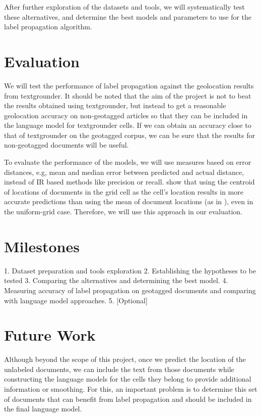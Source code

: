 \documentclass[11pt]{article}
\begin{document}
After further exploration of the datasets and tools, we will systematically test these alternatives, and determine the best models and parameters to use 
for the label propagation algorithm.


\section{Evaluation}
We will test the performance of label propagation against the geolocation results from textgrounder. 
It should be noted that the aim of the project is not to beat the results obtained using textgrounder,
but instead to get a reasonable geolocation accuracy on non-geotagged articles 
so that they can be included in the language model for textgrounder cells. 
If we can obtain an accuracy close to that of textgrounder on the geotagged corpus, 
we can be sure that the results for non-geotagged documents will be useful.

To evaluate the performance of the models, we will use measures based on error distances, e.g, mean and median error between predicted and actual distance,  
instead of IR based methods like precision or recall. \cite{Roller et al} show that using the centroid of locations of documents in the grid cell as the cell's location 
results in more accurate predictions than using the mean of document locations (as in \cite{wing-baldridge:11}), even in the uniform-grid case. Therefore, we will
use this approach in our evaluation.


\section{Milestones}
1. Dataset preparation and tools exploration
2. Establishing the hypotheses to be tested
3. Comparing the alternatives and determining the best model.
4. Measuring accuracy of label propagation on geotagged documents and comparing with language model approaches.
5. [Optional] 

\section{Future Work}

Although beyond the scope of this project, once we predict the location of the unlabeled documents, we can include the text from those documents
while constructing the language models for the cells they belong to provide additional information or smoothing. For this, an important problem is to 
determine this set of documents that can benefit from label propagation and should be included in the final language model.
\end{document}
